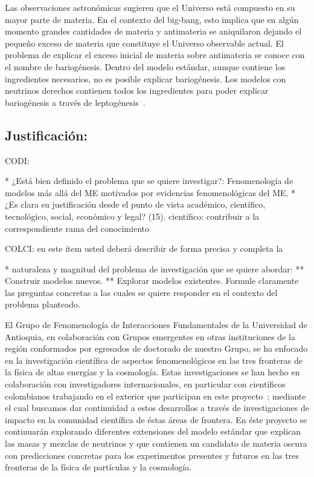 Las observaciones astronómicas sugieren que el Universo está compuesto
en su mayor parte de materia. En el contexto del big-bang, esto
implica que en algún momento grandes cantidades de materia y
antimateria se aniquilaron dejando el pequeño exceso de materia que
constituye el Universo observable actual. El problema de explicar el
exceso inicial de materia sobre antimateria se conoce con el nombre de
bariogénesis. Dentro del modelo estándar, aunque contiene los
ingredientes necesarios, no es posible explicar bariogénesis. Los
modelos con neutrinos derechos contienen todos los ingredientes para
poder explicar bariogénesis a través de leptogénesis~\cite{}.




\subsection{Justificación:                                 }
\begin{instrucciones}
  CODI: 

  * ¿Está bien definido el problema que se quiere investigar?:
  Fenomenología de modelos más allá del ME motivados por evidencias
  fenomenológicas del ME.  
  * ¿Es clara su justificación desde el punto de vista académico,
  científico, tecnológico, social, económico y legal? (15).
  científico: contribuir a la correspondiente rama del conocimiento

  COLCI: en este ítem usted deberá describir de forma precisa y completa la
  
  * naturaleza y magnitud del problema de investigación que se quiere
  abordar:
  ** Construir modelos nuevos.
  ** Explorar modelos existentes.
  Formule claramente las preguntas concretas a las cuales se
  quiere responder en el contexto del problema planteado.
\end{instrucciones}
El Grupo de Fenomenología de Interacciones Fundamentales de la
Universidad de Antioquia, en colaboración con Grupos emergentes en
otras instituciones de la región conformados por egresados de
doctorado de nuestro Grupo, se ha enfocado en la investigación
científica de aspectos fenomenológicos en las tres fronteras de la
física de altas energías y la cosmología. Estas investigaciones se han
hecho en colaboración con investigadores internacionales, en
particular con científicos colombianos trabajando en el exterior que
participan en este
proyecto~\cite{Sierra:2009zq,Sierra:2008wj,AristizabalSierra:2008ye,Choi:2010jt,AristizabalSierra:2009bh};
mediante el cual buscamos dar continuidad a estos desarrollos a través
de investigaciones de impacto en la comunidad científica de éstas
áreas de frontera. En éste proyecto se continuarán explorando
diferentes extensiones del modelo estándar que explican las masas y
mezclas de neutrinos y que contienen un candidato de materia oscura
con predicciones concretas para los experimentos presentes y futuros
en las tres fronteras de la física de partículas y la cosmología.

